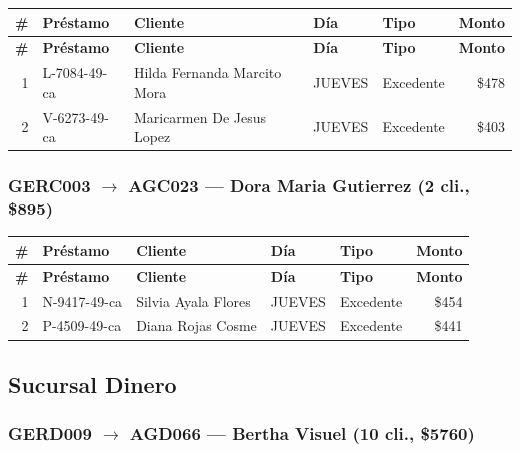 \documentclass[11pt,a4paper]{article}
\newcommand{\money}[1]{\$\num{#1}}
\begin{document}
\begin{center}
\renewcommand{\arraystretch}{1.1}
\footnotesize
\begin{longtable}{rlp{5.5cm}llr}
\toprule
\textbf{\#} & \textbf{Pr\'estamo} & \textbf{Cliente} & \textbf{D\'ia} & \textbf{Tipo} & \textbf{Monto} \\
\midrule
\endfirsthead
\toprule
\textbf{\#} & \textbf{Pr\'estamo} & \textbf{Cliente} & \textbf{D\'ia} & \textbf{Tipo} & \textbf{Monto} \\
\midrule
\endhead
1 & L-7084-49-ca & Hilda Fernanda Marcito Mora & JUEVES & Excedente & \money{478} \\
2 & V-6273-49-ca & Maricarmen De Jesus Lopez & JUEVES & Excedente & \money{403} \\

\bottomrule
\end{longtable}
\end{center}
\subsubsection{GERC003 $\rightarrow$ AGC023 --- Dora Maria Gutierrez (2 cli., \money{895})}


\begin{center}
\renewcommand{\arraystretch}{1.1}
\footnotesize
\begin{longtable}{rlp{5.5cm}llr}
\toprule
\textbf{\#} & \textbf{Pr\'estamo} & \textbf{Cliente} & \textbf{D\'ia} & \textbf{Tipo} & \textbf{Monto} \\
\midrule
\endfirsthead
\toprule
\textbf{\#} & \textbf{Pr\'estamo} & \textbf{Cliente} & \textbf{D\'ia} & \textbf{Tipo} & \textbf{Monto} \\
\midrule
\endhead
1 & N-9417-49-ca & Silvia Ayala Flores & JUEVES & Excedente & \money{454} \\
2 & P-4509-49-ca & Diana Rojas Cosme & JUEVES & Excedente & \money{441} \\

\bottomrule
\end{longtable}
\end{center}
\subsection{Sucursal Dinero}

\subsubsection{GERD009 $\rightarrow$ AGD066 --- Bertha Visuel (10 cli., \money{5760})}
\end{document}
